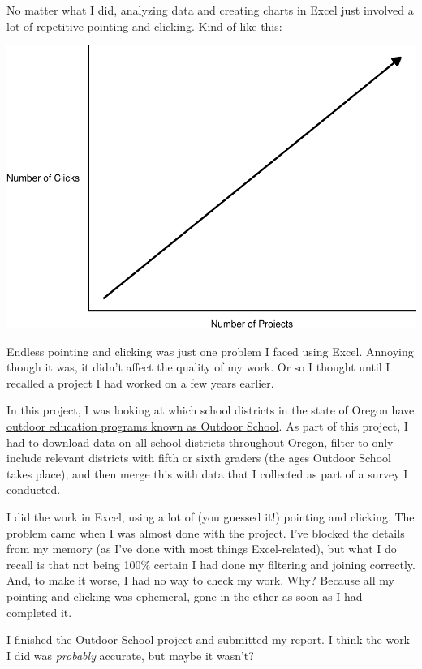 \documentclass[
]{book}
\begin{document}
No matter what I did, analyzing data and creating charts in Excel just involved a lot of repetitive pointing and clicking. Kind of like this:

\includegraphics[width=1\linewidth]{introduction_files/figure-latex/unnamed-chunk-2-1}

Endless pointing and clicking was just one problem I faced using Excel. Annoying though it was, it didn't affect the quality of my work. Or so I thought until I recalled a project I had worked on a few years earlier.

In this project, I was looking at which school districts in the state of Oregon have \href{https://oregonstate.app.box.com/s/83g5sjdm88xgqdxfze0ri7qo4uff5sj7}{outdoor education programs known as Outdoor School}. As part of this project, I had to download data on all school districts throughout Oregon, filter to only include relevant districts with fifth or sixth graders (the ages Outdoor School takes place), and then merge this with data that I collected as part of a survey I conducted.

I did the work in Excel, using a lot of (you guessed it!) pointing and clicking. The problem came when I was almost done with the project. I've blocked the details from my memory (as I've done with most things Excel-related), but what I do recall is that not being 100\% certain I had done my filtering and joining correctly. And, to make it worse, I had no way to check my work. Why? Because all my pointing and clicking was ephemeral, gone in the ether as soon as I had completed it.

I finished the Outdoor School project and submitted my report. I think the work I did was \emph{probably} accurate, but maybe it wasn't?
\end{document}

